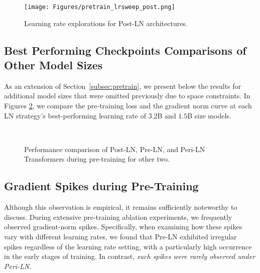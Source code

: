 \begin{figure}[ht!]
    \centering
    \texttt{[image: Figures/pretrain\_lrsweep\_post.png]} 
    \caption{Learning rate explorations for Post-LN architectures.}
    \label{fig:pretrain_lrwseep_post}
\end{figure}




\subsection{Best Performing Checkpoints Comparisons of Other Model Sizes} \label{appendix:best_perform_loss_others}
As an extension of Section~\ref{subsec:pretrain}, we present below the results for additional model sizes that were omitted previously due to space constraints. In Figures \ref{fig:pretraining_others}, we compare the pre-training loss and the gradient norm curve at each LN strategy’s best-performing learning rate of $3.2$B and $1.5$B size models. 

\begin{figure}[ht!]
    \centering
    \\
    \caption{
    Performance comparison of Post-LN, Pre-LN, and Peri-LN Transformers during pre-training for other two. 
    }
    \label{fig:pretraining_others}
\end{figure}

\subsection{Gradient Spikes during Pre-Training}
Although this observation is empirical, it remains sufficiently noteworthy to discuss. During extensive pre-training ablation experiments, we frequently observed gradient-norm spikes. Specifically, when examining how these spikes vary with different learning rates, we found that Pre-LN exhibited irregular spikes regardless of the learning rate setting, with a particularly high occurrence in the early stages of training. In contrast, \emph{such spikes were rarely observed under Peri-LN.}

